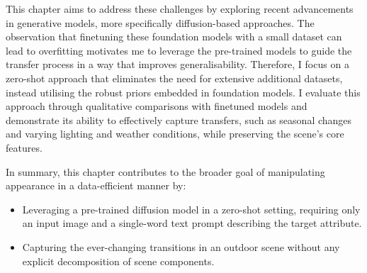 This chapter aims to address these challenges by exploring recent advancements in generative models, more specifically diffusion-based approaches. The observation that finetuning these foundation models with a small dataset can lead to overfitting motivates me to leverage the pre-trained models to guide the transfer process in a way that improves generalisability. Therefore, I focus on a zero-shot approach that eliminates the need for extensive additional datasets, instead utilising the robust priors embedded in foundation models. I evaluate this approach through qualitative comparisons with finetuned models and demonstrate its ability to effectively capture transfers, such as seasonal changes and varying lighting and weather conditions, while preserving the scene's core features.


In summary, this chapter contributes to the broader goal of manipulating appearance in a data-efficient manner by:

\begin{itemize}

   \item Leveraging a pre-trained diffusion model in a zero-shot setting, requiring only an input image and a single-word text prompt describing the target attribute.
    
   \item Capturing the ever-changing transitions in an outdoor scene without any explicit decomposition of scene components.

\end{itemize}
